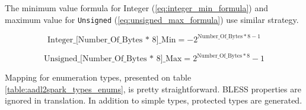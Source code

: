 The minimum value formula for Integer (\ref{eq:integer_min_formula}) and maximum value for \lstinline{Unsigned} (\ref{eq:unsigned_max_formula}) use similar strategy.

\begin{equation} \label{eq:integer_min_formula}
	\text{Integer\_[Number\_Of\_Bytes * 8]\_Min} = -2^{\text{Number\_Of\_Bytes} * 8 - 1}
\end{equation}

\begin{equation} \label{eq:unsigned_max_formula}
	\text{Unsigned\_[Number\_Of\_Bytes * 8]\_Max} = 2^{\text{Number\_Of\_Bytes} * 8} - 1
\end{equation}

Mapping for enumeration types, presented on table \ref{table:aadl2spark_types_enums}, is pretty straightforward. BLESS properties are ignored in translation. In addition to simple types, protected types are generated.


